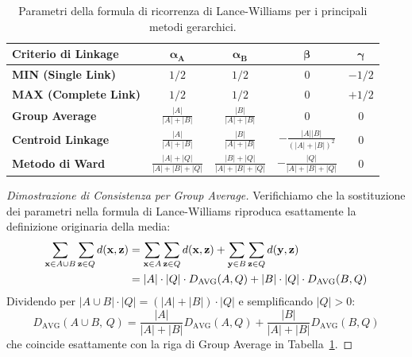 \begin{table}[H]
\centering
\footnotesize
\setlength{\tabcolsep}{4pt}
\renewcommand{\arraystretch}{1.25}
\begin{tabular}{l c c c c}
\toprule
\textbf{Criterio di Linkage} & $\mathbf{\alpha_A}$ & $\mathbf{\alpha_B}$ & $\mathbf{\beta}$ & $\mathbf{\gamma}$ \\
\midrule
\textbf{MIN (Single Link)} & $1/2$ & $1/2$ & $0$ & $-1/2$ \\
\textbf{MAX (Complete Link)} & $1/2$ & $1/2$ & $0$ & $+1/2$ \\
\textbf{Group Average} & $\frac{|A|}{|A| + |B|}$ & $\frac{|B|}{|A| + |B|}$ & $0$ & $0$ \\[3pt]
\textbf{Centroid Linkage} & $\frac{|A|}{|A| + |B|}$ & $\frac{|B|}{|A| + |B|}$ & $-\frac{|A||B|}{(|A| + |B|)^2}$ & $0$ \\[3pt]
\textbf{Metodo di Ward} & $\frac{|A| + |Q|}{|A| + |B| + |Q|}$ & $\frac{|B| + |Q|}{|A| + |B| + |Q|}$ & $-\frac{|Q|}{|A| + |B| + |Q|}$ & $0$ \\
\bottomrule
\end{tabular}
\caption{Parametri della formula di ricorrenza di Lance-Williams per i principali metodi gerarchici.}
\label{tab:dm-lance-williams-parameters}
\end{table}

\begin{proof}[Dimostrazione di Consistenza per Group Average]
Verifichiamo che la sostituzione dei parametri nella formula di Lance-Williams riproduca esattamente la definizione originaria della media:
\begin{align}
    \sum_{\mathbf{x} \in A \cup B} \sum_{\mathbf{z} \in Q} d(\mathbf{x}, \mathbf{z}) &= \sum_{\mathbf{x} \in A} \sum_{\mathbf{z} \in Q} d(\mathbf{x}, \mathbf{z}) + \sum_{\mathbf{y} \in B} \sum_{\mathbf{z} \in Q} d(\mathbf{y}, \mathbf{z}) \notag \\
    &= |A| \cdot |Q| \cdot D_{\text{AVG}}(A, Q) + |B| \cdot |Q| \cdot D_{\text{AVG}}(B, Q)
\end{align}
Dividendo per $|A \cup B| \cdot |Q| = (|A| + |B|) \cdot |Q|$ e semplificando $|Q| > 0$:
\begin{equation}
    D_{\text{AVG}}(A \cup B, \, Q) = \frac{|A|}{|A| + |B|} D_{\text{AVG}}(A, Q) + \frac{|B|}{|A| + |B|} D_{\text{AVG}}(B, Q)
\end{equation}
che coincide esattamente con la riga di Group Average in Tabella~\ref{tab:dm-lance-williams-parameters}.
\end{proof}

